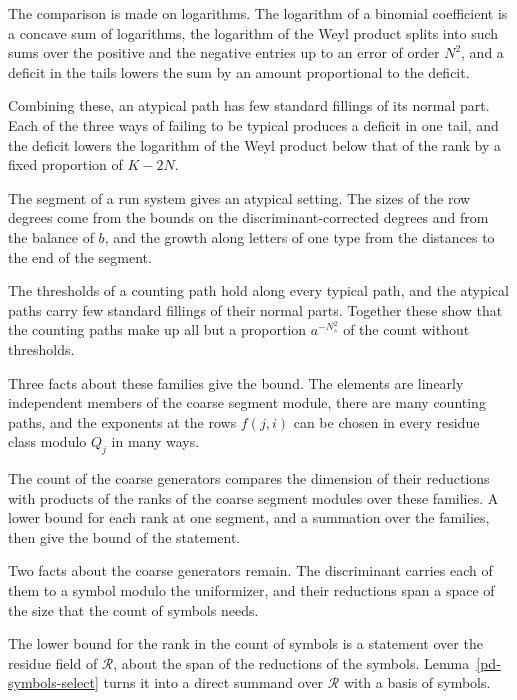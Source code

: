 The comparison is made on logarithms. The logarithm of a binomial coefficient is a concave sum of logarithms, the
logarithm of the Weyl product splits into such sums over the positive and the negative entries up to an error of order
$N^2$, and a deficit in the tails lowers the sum by an amount proportional to the deficit.

Combining these, an atypical path has few standard fillings of its normal part. Each of the three ways of failing to be
typical produces a deficit in one tail, and the deficit lowers the logarithm of the Weyl product below that of the rank
by a fixed proportion of $K-2N$.

The segment of a run system gives an atypical setting. The sizes of the row degrees come from the bounds on the
discriminant-corrected degrees and from the balance of $b$, and the growth along letters of one type from the distances
to the end of the segment.

The thresholds of a counting path hold along every typical path, and the atypical paths carry few standard fillings of
their normal parts. Together these show that the counting paths make up all but a proportion $a^{-N_s^2}$ of the count
without thresholds.

Three facts about these families give the bound. The elements are linearly independent members of the coarse
segment module, there are many counting paths, and the exponents at the rows $f(j,i)$ can be chosen in every
residue class modulo $Q_j$ in many ways.

The count of the coarse generators compares the dimension of their reductions with products of the ranks of
the coarse segment modules over these families. A lower bound for each rank at one segment, and a summation
over the families, then give the bound of the statement.

Two facts about the coarse generators remain. The discriminant carries each of them to a symbol modulo
the uniformizer, and their reductions span a space of the size that the count of symbols needs.

The lower bound for the rank in the count of symbols is a statement over the residue field of
$\mathcal R$, about the span of the reductions of the symbols. Lemma~\ref{pd-symbols-select} turns it
into a direct summand over $\mathcal R$ with a basis of symbols.

